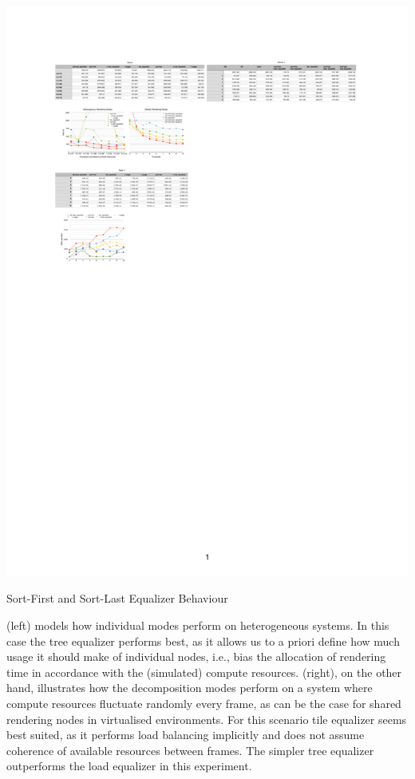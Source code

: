 \begin{benchmark}[h!t]
  \includegraphics[width=\textwidth]{results/equalizers}
  \caption{\label{rEqualizers}Sort-First and Sort-Last Equalizer Behaviour}
\end{benchmark}

 (left) models how individual modes perform on heterogeneous
systems. In this case the tree equalizer performs best, as it allows us to a
priori define how much usage it should make of individual nodes, i.e., bias the
allocation of rendering time in accordance with the (simulated) compute
resources.  (right), on the other hand, illustrates how the
decomposition modes perform on a system where compute resources fluctuate
randomly every frame, as can be the case for shared rendering nodes in
virtualised environments. For this scenario tile equalizer seems best suited,
as it performs load balancing implicitly and does not assume coherence of
available resources between frames. The simpler tree equalizer outperforms the
load equalizer in this experiment.

